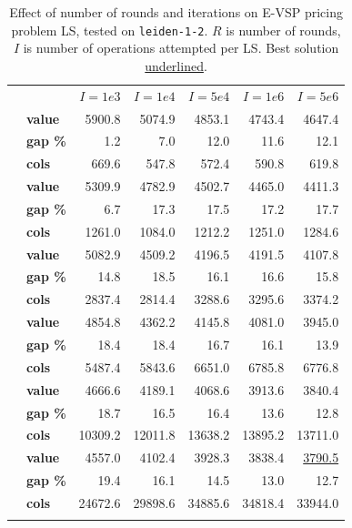 \documentclass[]{article}
\begin{document}
\begin{table}[h]
  \centering
  \begin{tabular}{llrrrrr}
    \toprule
    && $I=1e3$ & $I=1e4$ & $I=5e4$ & $I=1e6$ & $I=5e6$  \\
    \arrayrulecolor{black!30}\cmidrule(lr){1-7}
    \addlinespace[0.4em]
    \multirow{3}{*}{$R=100$} & \textbf{value}  & 5900.8 & 5074.9 & 4853.1 & 4743.4 & 4647.4 \\
    & \textbf{gap \%} & 1.2 & 7.0 & 12.0 & 11.6 & 12.1 \\
    & \textbf{cols} & 669.6 & 547.8 & 572.4 & 590.8 & 619.8 \\
    \arrayrulecolor{black!30}\cmidrule(lr){1-7}
    \multirow{3}{*}{$R=200$} & \textbf{value}  & 5309.9 & 4782.9 & 4502.7 & 4465.0 & 4411.3 \\
    & \textbf{gap \%} & 6.7 & 17.3 & 17.5 & 17.2 & 17.7 \\
    & \textbf{cols} & 1261.0 & 1084.0 & 1212.2 & 1251.0 & 1284.6 \\
    \arrayrulecolor{black!30}\cmidrule(lr){1-7}
    \multirow{3}{*}{$R=500$} & \textbf{value}  & 5082.9 & 4509.2 & 4196.5 & 4191.5 & 4107.8 \\
    & \textbf{gap \%} & 14.8 & 18.5 & 16.1 & 16.6 & 15.8 \\
    & \textbf{cols} & 2837.4 & 2814.4 & 3288.6 & 3295.6 & 3374.2 \\
    \arrayrulecolor{black!30}\cmidrule(lr){1-7}
    \multirow{3}{*}{$R=1000$} & \textbf{value}  & 4854.8 & 4362.2 & 4145.8 & 4081.0 & 3945.0 \\
    & \textbf{gap \%} & 18.4 & 18.4 & 16.7 & 16.1 & 13.9 \\
    & \textbf{cols} & 5487.4 & 5843.6 & 6651.0 & 6785.8 & 6776.8 \\
    \arrayrulecolor{black!30}\cmidrule(lr){1-7}
    \multirow{3}{*}{$R=2000$} & \textbf{value}  & 4666.6 & 4189.1 & 4068.6 & 3913.6 & 3840.4 \\
    & \textbf{gap \%} & 18.7 & 16.5 & 16.4 & 13.6 & 12.8 \\
    & \textbf{cols} & 10309.2 & 12011.8 & 13638.2 & 13895.2 & 13711.0 \\
    \arrayrulecolor{black!30}\cmidrule(lr){1-7}
    \multirow{3}{*}{$R=5000$} & \textbf{value}  & 4557.0 & 4102.4 & 3928.3 & 3838.4 & \underline{3790.5} \\
    & \textbf{gap \%} & 19.4 & 16.1 & 14.5 & 13.0 & 12.7 \\
    & \textbf{cols} & 24672.6 & 29898.6 & 34885.6 & 34818.4 & 33944.0 \\
    \arrayrulecolor{black}\bottomrule
  \end{tabular}
  \caption{Effect of number of rounds and iterations on E-VSP pricing problem LS, tested on \texttt{leiden-1-2}. $R$ is number of rounds, $I$ is number of operations attempted per LS. Best solution \underline{underlined}.}
  \label{tab:evsp-ls-single}
\end{table}
\end{document}
